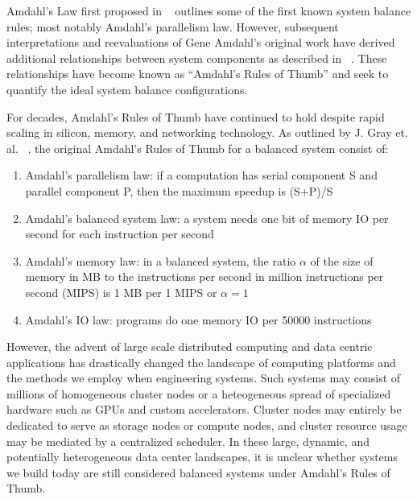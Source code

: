 \documentclass{sig-alternate}
\begin{document}

Amdahl's Law first proposed in ~\cite{Amdahl:1967:VSP:1465482.1465560} outlines some of the first known system balance rules; most notably Amdahl's parallelism law.
However, subsequent interpretations and reevaluations of Gene Amdahl's original work have derived additional relationships between system components as described in ~\cite{Gustafson:1988:RAL:42411.42415, Hill:2008:ALM:1449375.1449387, export:68636, Bell:2006:PCS:1110638.1110681}.
These relationships have become known as ``Amdahl's Rules of Thumb'' and seek to quantify the ideal system balance configurations.

For decades, Amdahl's Rules of Thumb have continued to hold despite rapid scaling in silicon, memory, and networking technology.
As outlined by J. Gray et. al. ~\cite{export:68636}, the original Amdahl's Rules of Thumb for a balanced system consist of:
\begin{enumerate}
\item Amdahl's parallelism law: if a computation has serial component S and parallel component P, then the maximum speedup is (S+P)/S
\item Amdahl's balanced system law: a system needs one bit of memory IO per second for each instruction per second
\item Amdahl's memory law: in a balanced system, the ratio $\alpha$ of the size of memory in MB to the instructions per second in million instructions per second (MIPS) is 1 MB per 1 MIPS or $\alpha = 1$
\item Amdahl's IO law: programs do one memory IO per 50000 instructions
\end{enumerate}
However, the advent of large scale distributed computing and data centric applications has drastically changed the landscape of computing platforms and the methods we employ when engineering systems.
Such systems may consist of millions of homogeneous cluster nodes or a heteogeneous spread of specialized hardware such as GPUs and custom accelerators.
Cluster nodes may entirely be dedicated to serve as storage nodes or compute nodes, and cluster resource usage may be mediated by a centralized scheduler.
In these large, dynamic, and potentially heterogeneous data center landscapes, it is unclear whether systems we build today are still considered balanced systems under Amdahl's Rules of Thumb.
\end{document}
